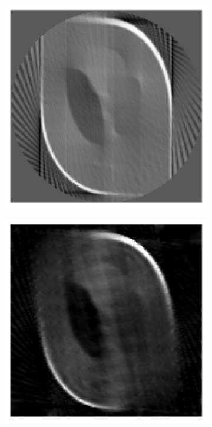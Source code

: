 \documentclass[12pt]{article}
\begin{document}
\begin{figure}
\begin{subfigure}{.073\textwidth}
\end{subfigure}%
\begin{subfigure}{.25\textwidth}
    \centering
    \includegraphics[width=\textwidth]{../figures/FBP-half.png}
\end{subfigure}
\begin{subfigure}{.25\textwidth}
    \centering
    \includegraphics[width=\textwidth]{../figures/TV-half.png}

\end{subfigure}
\end{figure}
\end{document}
